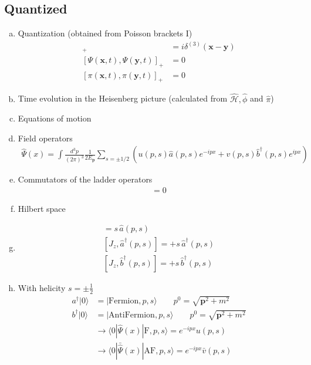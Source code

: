 \documentclass[10pt,a4paper]{report}
\theoremstyle{definition}
\begin{document}
\subsection{Quantized}
\begin{enumerate}[a)]
\item Quantization (obtained from Poisson brackets I)
\begin{align}
[\Psi(\mathbf{x},t),\pi(\mathbf{y},t)]_+&=i\delta^{(3)}(\mathbf{x}-\mathbf{y})\\
[\Psi(\mathbf{x},t),\Psi(\mathbf{y},t)]_+&=0\\
[\pi(\mathbf{x},t),\pi(\mathbf{y},t)]_+&=0
\end{align}

\item Time evolution in the Heisenberg picture (calculated from $\hat{\mathcal{H}}, \hat{\phi}$ and $\hat{\pi}$)

\item Equations of motion

\item Field operators
\begin{align}
\hat{\Psi}(x)=\int\frac{d^3p}{(2\pi)^3}\frac{1}{2E_\mathbf{p}}\sum_{s=\pm1/2}\left(u(p,s)\hat{a}(p,s)e^{-ipx}+v(p,s)\hat{b}^\dagger(p,s)e^{ipx}\right)
\end{align}

\item Commutators of the ladder operators
\begin{align}
[\hat{a}(p,s),\hat{a}(p',s')]=0
\end{align}

\item Hilbert space

\item 
\begin{align}
[\hat{a}(p,s),J_z]=s\,\hat{a}(p,s)\\
[J_z,\hat{a}^\dagger(p,s)]=+s\,\hat{a}^\dagger(p,s)\\
[J_z,\hat{b}^\dagger(p,s)]=+s\,\hat{b}^\dagger(p,s)
\end{align}

\item With helicity $s=\pm\frac{1}{2}$
\begin{align}
a^\dagger|0\rangle&=|\text{Fermion},p,s\rangle\qquad p^0=\sqrt{\mathbf{p}^2+m^2}\\
b^\dagger|0\rangle&=|\text{AntiFermion},p,s\rangle\qquad p^0=\sqrt{\mathbf{p}^2+m^2}\\
&\rightarrow\langle0|\hat{\Psi}(x)|\text{F},p,s\rangle=e^{-ipx}u(p,s)\\
&\rightarrow\langle0|\bar{\hat{\Psi}}(x)|\text{AF},p,s\rangle=e^{-ipx}\bar{v}(p,s)
\end{align}

\end{enumerate}
\end{document}
